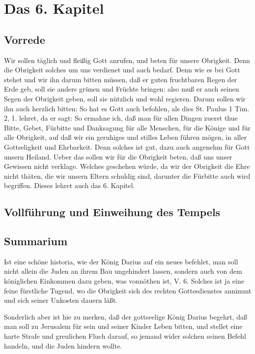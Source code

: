 \chapter{Das 6. Kapitel}

\section{Vorrede}

Wir sollen täglich und fleißig Gott anrufen, und beten für unsere Obrigkeit. Denn die Obrigkeit solches um uns verdienet und auch bedarf. Denn wie es bei Gott stehet und wir ihn darum bitten müssen, daß er guten fruchtbaren Regen der Erde geb, soll sie anders grünen und Früchte bringen: also muß er auch seinen Segen der Obrigkeit geben, soll sie nützlich und wohl regieren. Darum sollen wir ihn auch herzlich bitten: So hat es Gott auch befohlen, als dies St. Paulus 1 Tim. 2, 1. lehret, da er sagt: So ermahne ich, daß man für allen Dingen zuerst thue Bitte, Gebet, Fürbitte und Danksagung für alle Menschen, für die Könige und für alle Obrigkeit, auf daß wir ein geruhiges und stilles Leben führen mögen, in aller Gottseligkeit und Ehrbarkeit. Denn solches ist gut, dazu auch angenehm für Gott unsern Heiland. Ueber das sollen wir für die Obrigkeit beten, daß uns unser Gewissen nicht verklage. Welches geschehen würde, da wir der Obrigkeit die Ehre nicht thäten, die wir unsern Eltern schuldig sind, darunter die Fürbitte auch wird begriffen. Dieses lehret auch das 6. Kapitel.

\section{Vollführung und Einweihung des Tempels}


\section{Summarium}

Ist eine schöne historia, wie der König Darius auf ein neues befehlet, man soll nicht allein die Juden an ihrem Bau ungehindert lassen, sondern auch von dem königlichen Einkommen dazu geben, was vonnöthen ist, V. 6. Solches ist ja eine feine fürstliche Tugend, wo die Obrigkeit sich des rechten Gottesdienstes annimmt und sich seiner Unkosten dauern läßt.

Sonderlich aber ist hie zu merken, daß der gottseelige König Darius begehrt, daß man soll zu Jerusalem für sein und seiner Kinder Leben bitten, und stellet eine harte Strafe und greulichen Fluch darauf, so jemand wider solchen seinen Befehl handeln, und die Juden hindern wollte.

